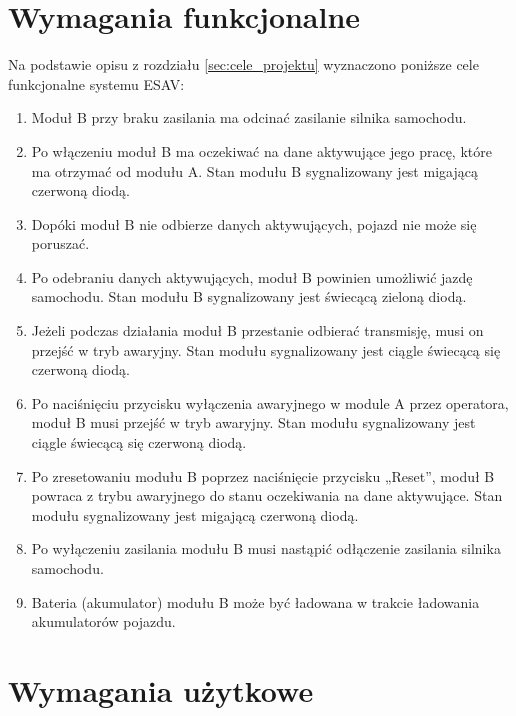 
\section{Wymagania funkcjonalne}
\label{sec:wymagania_funkcjonalne}

Na podstawie opisu z rozdziału \ref{sec:cele_projektu} wyznaczono poniższe cele funkcjonalne systemu ESAV:

\begin{enumerate}[label=\thesection.\arabic{*}.,leftmargin=4em]
\item \label{wym_fun1} Moduł B przy braku zasilania ma odcinać zasilanie silnika samochodu.
\item \label{wym_fun2} Po włączeniu moduł B ma oczekiwać na dane aktywujące jego pracę, które ma otrzymać od modułu A. Stan modułu B sygnalizowany jest migającą czerwoną diodą.
\item \label{wym_fun3} Dopóki moduł B nie odbierze danych aktywujących, pojazd nie może się poruszać.
\item \label{wym_fun4} Po odebraniu danych aktywujących, moduł B powinien umożliwić jazdę samochodu. Stan modułu B sygnalizowany jest świecącą zieloną diodą.
\item \label{wym_fun5} Jeżeli podczas działania moduł B przestanie odbierać transmisję, musi on przejść w tryb awaryjny. Stan modułu sygnalizowany jest ciągle świecącą się czerwoną diodą.
\item \label{wym_fun6} Po naciśnięciu przycisku wyłączenia awaryjnego w module A przez operatora, moduł B musi przejść w tryb awaryjny. Stan modułu sygnalizowany jest ciągle świecącą się czerwoną diodą.
\item \label{wym_fun7} Po zresetowaniu modułu B poprzez naciśnięcie przycisku „Reset”, moduł B powraca z trybu awaryjnego do stanu oczekiwania na dane aktywujące. Stan modułu sygnalizowany jest migającą czerwoną diodą.
\item \label{wym_fun8} Po wyłączeniu zasilania modułu B musi nastąpić odłączenie zasilania silnika samochodu.
\item \label{wym_fun9} Bateria (akumulator) modułu B może być ładowana w trakcie ładowania akumulatorów pojazdu.
\end{enumerate}


\section{Wymagania użytkowe}
\label{sec:wymagania_wydajnosciowe}

